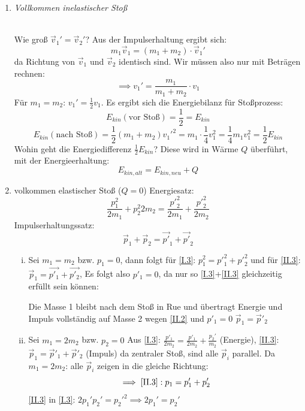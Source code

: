 \documentclass[a4paper,10pt]{scrartcl}
\begin{document}
\begin{sg}
 \begin{enumerate}[a]
  \item \emph{Vollkommen inelastischer Stoß}\\
\\
\begin{seg}{Wie groß $\vec v_1'=\vec v_2'$?}
Aus der Impulserhaltung ergibt sich:
\[
 m_1 \vec v_1= (m_1+m_2)\cdot \vec v_1'
\]
da Richtung von $\vec v_1$ und $\vec v_2$ identisch sind. Wir müssen also nur mit Beträgen rechnen:
\[
 \implies v_1'=\frac{m_1}{m_1+m_2} \cdot v_1
\]
Für $m_1=m_2$: $v_1'=\frac{1}{2} v_1$. Es ergibt sich die Energiebilanz für Stoßprozess:
\[
 E_{kin}(\text{vor Stoß})=\frac{1}{2}= E_{kin}
\]
\[
 E_{kin}(\text{nach Stoß})= \frac{1}{2} (m_1+m_2)v_1'^2=m_1\cdot \frac{1}{4} v_1^2=\frac{1}{4} m_1 v_1^2=\frac{1}{2} E_{kin}
\]
Wohin geht die Energiedifferenz $\frac{1}{2} E_{kin}$?
Diese wird in Wärme $Q$ überführt, mit der Energieerhaltung:
\[
 E_{kin,alt}=E_{kin,neu}+Q
\]
\end{seg}
 \item \begin{seg}{volkommen elastischer Stoß ($Q=0$)}
Energiesatz:
\begin{equation}
 \frac{p_1^2}{2m_1}+{p_2^2}{2m_2}= \frac{{p'}^2_2}{2m_1} + \frac{{p'}_2^2}{2m_2}    \label{I.3}
\end{equation}
Impulserhaltungssatz:
\begin{equation}
 \vec p_1 + \vec p_2 = \vec {p'}_1+ \vec {p'}_2 \label{II.3}
\end{equation}
\end{seg}
\begin{enumerate}[(i)]
\item Sei $m_1=m_2$ bzw. $p_1=0$, dann folgt für \ref{I.3}: $p_1^2={p'}_1^2+{p'}_2^2$ und für \ref{II.3}: $\vec p_1=\vec {p'_1}+\vec{p'_2}$, 
Es folgt also $p'_1=0$, da nur so \ref{I.3}+\ref{II.3} gleichzeitig erfüllt sein können:

Die Masse 1 bleibt nach dem Stoß in Rue und übertragt Energie und Impuls  vollständig auf Masse 2 wegen \ref{II.2} und $p'_1=0$ $\vec p_1=\vec p'_2$
\item Sei $m_1=2m_2$ bzw. $p_2=0$ 
Aus \ref{I.3}: $\frac{p'_1}{2m_2}=\frac{p'_1}{2m_2}+\frac{p_2'}{m_2}$ (Energie), \ref{II.3}: $\vec p_1=\vec p'_1+ \vec p'_2$ (Impuls)
da zentraler Stoß, sind alle $\vec p_i$ parallel. Da $m_1=2m_2$: alle $\vec p_i$ zeigen in die gleiche Richtung:
\[
 \implies \ref{II.3}: p_1=p_1'+p_2'
\]
\ref{II.3} in \ref{I.3}: $2p_1'p_2'= p_2'^2 \implies 2p_1'=p_2'$


\end{enumerate}
\end{enumerate}
\end{sg}
\end{document}
